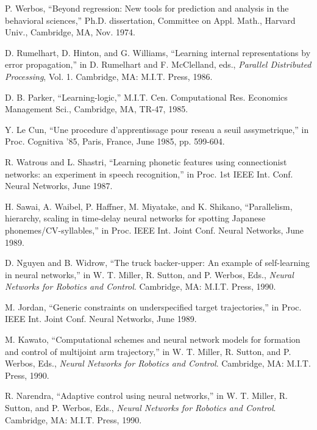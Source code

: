 \documentclass[journal]{IEEEtran} %
\begin{document}
\begin{thebibliography}{99}

P. Werbos, ``Beyond regression: New tools for prediction and analysis in the behavioral sciences,'' Ph.D. dissertation, Committee on Appl. Math., Harvard Univ., Cambridge, MA, Nov. 1974.

D. Rumelhart, D. Hinton, and G. Williams, ``Learning internal representations by error propagation,'' in D. Rumelhart and F. McClelland, eds., \emph{Parallel Distributed Processing}, Vol. 1. Cambridge, MA: M.I.T. Press, 1986.

D. B. Parker, ``Learning-logic,'' M.I.T. Cen. Computational Res. Economics Management Sci., Cambridge, MA, TR-47, 1985.

Y. Le Cun, ``Une procedure d'apprentissage pour reseau a seuil assymetrique,'' in Proc. Cognitiva '85, Paris, France, June 1985, pp. 599-604.

R. Watrous and L. Shastri, ``Learning phonetic features using connectionist networks: an experiment in speech recognition,'' in Proc. 1st IEEE Int. Conf. Neural Networks, June 1987.

H. Sawai, A. Waibel, P. Haffner, M. Miyatake, and K. Shikano, ``Parallelism, hierarchy, scaling in time-delay neural networks for spotting Japanese phonemes/CV-syllables,'' in Proc. IEEE Int. Joint Conf. Neural Networks, June 1989.

D. Nguyen and B. Widrow, ``The truck backer-upper: An example of self-learning in neural networks,'' in W. T. Miller, R. Sutton, and P. Werbos, Eds., \emph{Neural Networks for Robotics and Control}. Cambridge, MA: M.I.T. Press, 1990.

M. Jordan, ``Generic constraints on underspecified target trajectories,'' in Proc. IEEE Int. Joint Conf. Neural Networks, June 1989.

M. Kawato, ``Computational schemes and neural network models for formation and control of multijoint arm trajectory,'' in W. T. Miller, R. Sutton, and P. Werbos, Eds., \emph{Neural Networks for Robotics and Control}. Cambridge, MA: M.I.T. Press, 1990.

R. Narendra, ``Adaptive control using neural networks,'' in W. T. Miller, R. Sutton, and P. Werbos, Eds., \emph{Neural Networks for Robotics and Control}. Cambridge, MA: M.I.T. Press, 1990.


\end{thebibliography}
\end{document}
